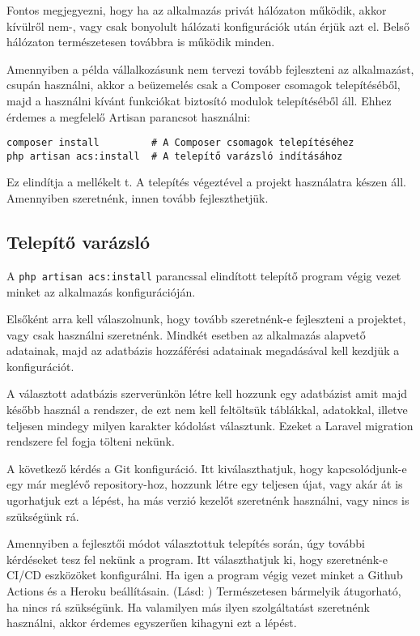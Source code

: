 \documentclass[a4paper,12pt]{thesis-ekf}
\theoremstyle{definition}
\begin{document}
		 Fontos megjegyezni, hogy ha az alkalmazás privát hálózaton működik, akkor kívülről nem-, vagy csak bonyolult hálózati konfigurációk után érjük azt el. Belső hálózaton természetesen továbbra is működik minden.
		
		Amennyiben a példa vállalkozásunk nem tervezi tovább fejleszteni az alkalmazást, csupán használni, akkor a beüzemelés csak a Composer csomagok telepítéséből, majd a használni kívánt funkciókat biztosító modulok telepítéséből áll. Ehhez érdemes a megfelelő Artisan parancsot használni:
		
		\begin{Verbatim}
composer install         # A Composer csomagok telepítéséhez
php artisan acs:install  # A telepítő varázsló indításához
		\end{Verbatim}
		
		Ez elindítja a mellékelt t. A telepítés végeztével a projekt használatra készen áll. Amennyiben szeretnénk, innen tovább fejleszthetjük.
		
		\subsection{Telepítő varázsló}\label{ssc-install-wizard}
		A \verb|php artisan acs:install| parancssal elindított telepítő program végig vezet minket az alkalmazás konfigurációján.
		
		Elsőként arra kell válaszolnunk, hogy tovább szeretnénk-e fejleszteni a projektet, vagy csak használni szeretnénk. Mindkét esetben az alkalmazás alapvető adatainak, majd az adatbázis hozzáférési adatainak megadásával kell kezdjük a konfigurációt.
		
		A választott adatbázis szerverünkön létre kell hozzunk egy adatbázist amit majd később használ a rendszer, de ezt nem kell feltöltsük táblákkal, adatokkal, illetve teljesen mindegy milyen karakter kódolást választunk. Ezeket a Laravel migration rendszere fel fogja tölteni nekünk. 
		
		A következő kérdés a Git konfiguráció. Itt kiválaszthatjuk, hogy kapcsolódjunk-e egy már meglévő repository-hoz, hozzunk létre egy teljesen újat, vagy akár át is ugorhatjuk ezt a lépést, ha más verzió kezelőt szeretnénk használni, vagy nincs is szükségünk rá. 
		
		Amennyiben a fejlesztői módot választottuk telepítés során, úgy további kérdéseket tesz fel nekünk a program. Itt választhatjuk ki, hogy szeretnénk-e CI/CD eszközöket konfigurálni. Ha igen a program végig vezet minket a Github Actions és a Heroku beállításain. (Lásd: ) Természetesen bármelyik átugorható, ha nincs rá szükségünk. Ha valamilyen más ilyen szolgáltatást szeretnénk használni, akkor érdemes egyszerűen kihagyni ezt a lépést.
		
\end{document}
